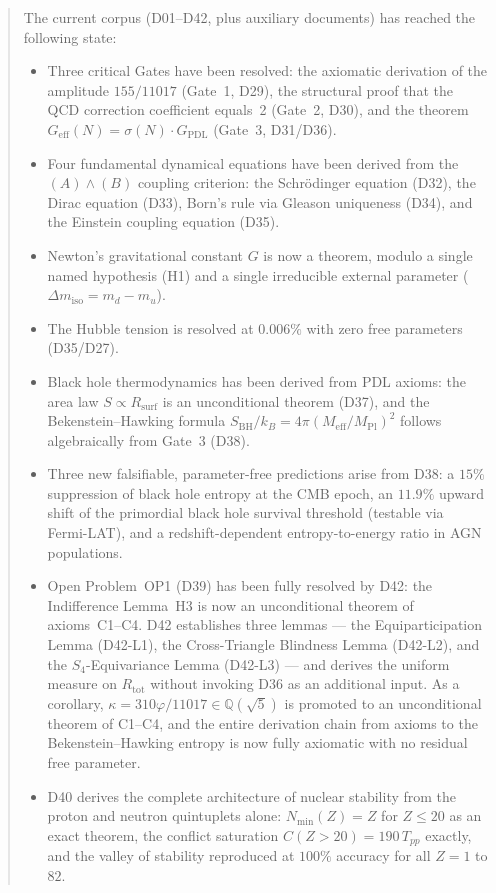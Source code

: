 \documentclass[11pt,a4paper]{article}
\theoremstyle{plain}
\theoremstyle{definition}
\theoremstyle{remark}
\newcommand{\Geff}{G_{\mathrm{eff}}}
\newcommand{\GPDL}{G_{\mathrm{PDL}}}
\newcommand{\Rsurf}{R_{\mathrm{surf}}}
\newcommand{\Rtot}{R_{\mathrm{tot}}}
\newcommand{\sigmaN}{\sigma(N)}
\newcommand{\SBH}{S_{\mathrm{BH}}}
\newcommand{\Meff}{M_{\mathrm{eff}}}
\newcommand{\MPl}{M_{\mathrm{Pl}}}
\newcommand{\Tpp}{T_{pp}}
\newcommand{\Nmin}{N_{\min}}
\begin{document}
\begin{abstract}
The current corpus (D01--D42, plus auxiliary documents) has reached the following state:
\begin{itemize}
\item Three critical Gates have been resolved: the axiomatic derivation of the amplitude $155/11017$ (Gate~1, D29), the structural proof that the QCD correction coefficient equals~2 (Gate~2, D30), and the theorem $\Geff(N)=\sigmaN\cdot\GPDL$ (Gate~3, D31/D36).
\item Four fundamental dynamical equations have been derived from the $(A)\wedge(B)$ coupling criterion: the Schr\"odinger equation (D32), the Dirac equation (D33), Born's rule via Gleason uniqueness (D34), and the Einstein coupling equation (D35).
\item Newton's gravitational constant $G$ is now a theorem, modulo a single named hypothesis (H1) and a single irreducible external parameter ($\Delta m_{\mathrm{iso}} = m_d - m_u$).
\item The Hubble tension is resolved at $0.006\%$ with zero free parameters (D35/D27).
\item Black hole thermodynamics has been derived from PDL axioms: the area law $S \propto \Rsurf$ is an unconditional theorem (D37), and the Bekenstein--Hawking formula $\SBH/k_B = 4\pi(\Meff/\MPl)^2$ follows algebraically from Gate~3 (D38).
\item Three new falsifiable, parameter-free predictions arise from D38: a $15\%$ suppression of black hole entropy at the CMB epoch, an $11.9\%$ upward shift of the primordial black hole survival threshold (testable via Fermi-LAT), and a redshift-dependent entropy-to-energy ratio in AGN populations.
\item Open Problem~OP1 (D39) has been fully resolved by D42: the Indifference Lemma~H3 is now an unconditional theorem of axioms~C1--C4. D42 establishes three lemmas --- the Equiparticipation Lemma (D42-L1), the Cross-Triangle Blindness Lemma (D42-L2), and the $S_4$-Equivariance Lemma (D42-L3) --- and derives the uniform measure on $\Rtot$ without invoking D36 as an additional input. As a corollary, $\kappa = 310\varphi/11017 \in \mathbb{Q}(\sqrt{5})$ is promoted to an unconditional theorem of C1--C4, and the entire derivation chain from axioms to the Bekenstein--Hawking entropy is now fully axiomatic with no residual free parameter.
\item D40 derives the complete architecture of nuclear stability from the proton and neutron quintuplets alone: $\Nmin(Z) = Z$ for $Z \leq 20$ as an exact theorem, the conflict saturation $C(Z>20) = 190\,\Tpp$ exactly, and the valley of stability reproduced at $100\%$ accuracy for all $Z=1$ to $82$.

\end{itemize}
\end{abstract}
\end{document}
